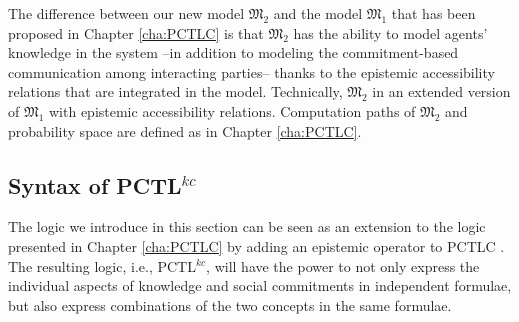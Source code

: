The difference between our new model $\mathfrak{M_2}$ and the model $\mathfrak{M_1}$ that has been proposed in Chapter \ref{cha:PCTLC} is that $\mathfrak{M_2}$ has the ability to model agents' knowledge in the system --in addition to modeling the commitment-based communication among interacting parties-- thanks to the epistemic accessibility relations that are integrated in the model. Technically, $\mathfrak{M_2}$ in an extended version of $\mathfrak{M_1}$ with epistemic accessibility relations. Computation paths of $\mathfrak{M_2}$ and probability space are defined as in Chapter \ref{cha:PCTLC}. %



\subsection{Syntax of PCTL$^{kc}$} \label{sec:syntax-PCTLKC}
The logic we introduce in this section can be seen as an extension to the logic presented in Chapter \ref{cha:PCTLC} by adding an epistemic operator to PCTLC \cite{Sultan2014a,Sultan2013}. The resulting logic, i.e., PCTL$^{kc}$, will have the power to not only express the individual aspects of knowledge and social commitments in independent formulae, but also express combinations of the two concepts in the same formulae.

